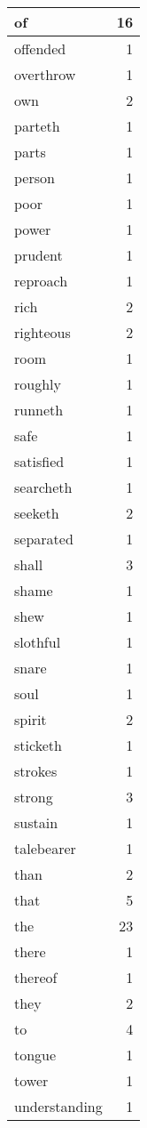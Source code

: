 \begin{center}
\begin{longtable}{l|r}
of & 16\\ \hline 
offended & 1\\ \hline 
overthrow & 1\\ \hline 
own & 2\\ \hline 
parteth & 1\\ \hline 
parts & 1\\ \hline 
person & 1\\ \hline 
poor & 1\\ \hline 
power & 1\\ \hline 
prudent & 1\\ \hline 
reproach & 1\\ \hline 
rich & 2\\ \hline 
righteous & 2\\ \hline 
room & 1\\ \hline 
roughly & 1\\ \hline 
runneth & 1\\ \hline 
safe & 1\\ \hline 
satisfied & 1\\ \hline 
searcheth & 1\\ \hline 
seeketh & 2\\ \hline 
separated & 1\\ \hline 
shall & 3\\ \hline 
shame & 1\\ \hline 
shew & 1\\ \hline 
slothful & 1\\ \hline 
snare & 1\\ \hline 
soul & 1\\ \hline 
spirit & 2\\ \hline 
sticketh & 1\\ \hline 
strokes & 1\\ \hline 
strong & 3\\ \hline 
sustain & 1\\ \hline 
talebearer & 1\\ \hline 
than & 2\\ \hline 
that & 5\\ \hline 
the & 23\\ \hline 
there & 1\\ \hline 
thereof & 1\\ \hline 
they & 2\\ \hline 
to & 4\\ \hline 
tongue & 1\\ \hline 
tower & 1\\ \hline 
understanding & 1\\ \hline 

\end{longtable}
\end{center}
